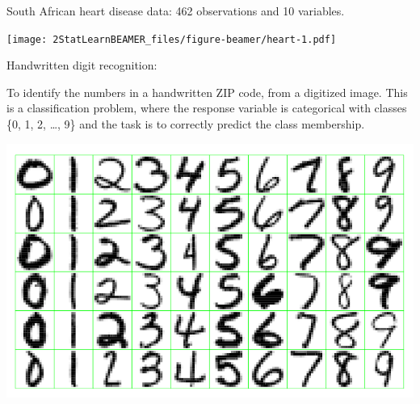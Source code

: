 \documentclass[ignorenonframetext,]{beamer}
\begin{document}
\begin{frame}

South African heart disease data: 462 observations and 10 variables.

\texttt{[image: 2StatLearnBEAMER\_files/figure-beamer/heart-1.pdf]}

\end{frame}

\begin{frame}

\begin{block}{Handwritten digit recognition:}

To identify the numbers in a handwritten ZIP code, from a digitized
image. This is a classification problem, where the response variable is
categorical with classes \{0, 1, 2, \ldots{}, 9\} and the task is to
correctly predict the class membership.

\includegraphics{digits.png}

\end{block}

\end{frame}
\end{document}
